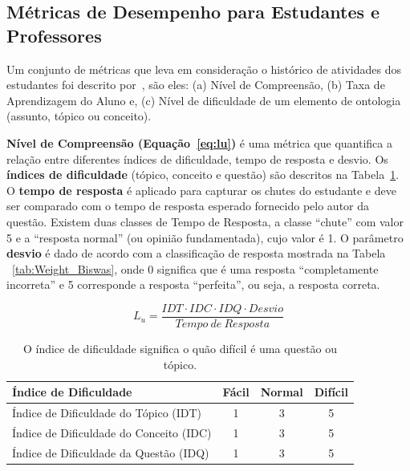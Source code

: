 \subsection{Métricas de Desempenho para Estudantes e Professores}
\label{sec:level-understanding}

Um conjunto de métricas que leva em consideração o histórico de atividades dos estudantes foi descrito por~\cite{Biswas:2007}, são eles: (a) Nível de Compreensão, (b) Taxa de Aprendizagem do Aluno e, (c) Nível de dificuldade de um elemento de ontologia (assunto, tópico ou conceito).

\textbf{Nível de Compreensão (Equação~\ref{eq:lu})} é uma métrica que quantifica a relação entre diferentes índices de dificuldade, tempo de resposta e desvio. Os \textbf{índices de dificuldade} (tópico, conceito e questão) são descritos na Tabela~\ref{tab:Lu}.
O \textbf{tempo de resposta} é aplicado para capturar os chutes do estudante e deve ser comparado com o tempo de resposta esperado fornecido pelo autor da questão. Existem duas classes de Tempo de Resposta, a classe ``chute'' com valor 5 e a ``resposta normal'' (ou opinião fundamentada), cujo valor é 1.
O parâmetro \textbf{desvio} é dado de acordo com a classificação de resposta mostrada na Tabela ~\ref{tab:Weight_Biswas}, onde 0 significa que é uma resposta ``completamente incorreta'' e 5 corresponde a resposta ``perfeita'', ou seja, a resposta correta.

\begin{equation}\label{eq:lu}
L_u = \frac{IDT \cdot IDC \cdot IDQ \cdot Desvio}{Tempo \ de \ Resposta}
\end{equation}

\begin{table}[htbp]
\centering
\caption{O índice de dificuldade significa o quão difícil é uma questão ou tópico.}
\begin{center}
\begin{tabular}{|l|c|c|c|}
\hline
\textbf{Índice de Dificuldade} & \textbf{Fácil} & \textbf{Normal} & \textbf{Difícil} \\\hline
Índice de Dificuldade do Tópico (IDT) & 1 & 3 & 5 \\\hline
Índice de Dificuldade do Conceito (IDC) & 1 & 3 & 5 \\\hline
Índice de Dificuldade da Questão (IDQ) & 1 & 3 & 5 \\\hline
\end{tabular}
\end{center}
\label{tab:Lu}
\end{table}

